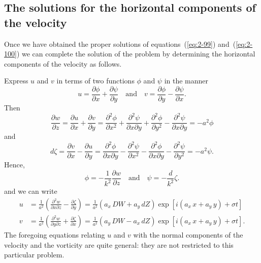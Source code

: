 \subsection{The solutions for the horizontal components of the velocity}\label{sec:10a}

Once we have obtained the proper solutions of equations~(\ref{eq:2-99}) and~(\ref{eq:2-100}) we can complete the solution of the problem by determining the
horizontal components of the velocity as follows.

Express $u$ and $v$ in terms of two functions $\phi$ and $\psi$ in the manner
\begin{equation}
\label{eq:2-106}
u = \frac{\partial\phi}{\partial x}+\frac{\partial\psi}{\partial y} \quad\text{and}\quad v = \frac{\partial\phi}{\partial y}-\frac{\partial\psi}{\partial x}.
\end{equation}
Then
\begin{equation}
\label{eq:2-107}
\frac{\partial w}{\partial z} = \frac{\partial u}{\partial x}+\frac{\partial v}{\partial y} = \frac{\partial^2\phi}{\partial x^2}+\frac{\partial^2\psi}{\partial x\partial y}+\frac{\partial^2\phi}{\partial y^2}-\frac{\partial^2\psi}{\partial x\partial y} = -a^2\phi
\end{equation}
and
\begin{equation}
\label{eq:2-108}
d\zeta = \frac{\partial v}{\partial x}-\frac{\partial u}{\partial y} = \frac{\partial^2\phi}{\partial x\partial y}-\frac{\partial^2\psi}{\partial x^2}-\frac{\partial^2\phi}{\partial x\partial y}-\frac{\partial^2\psi}{\partial y^2} = -a^2\psi.
\end{equation}
Hence,
\begin{equation}
\label{eq:2-109}
\phi = -\frac{1}{k^2}\frac{\partial w}{\partial z} \quad\text{and}\quad \psi = -\frac{d}{k^2}\zeta.
\end{equation}
and we can write
\begin{align}
\label{eq:2-110}
u &= \frac{1}{a^2}\!\left(\frac{\partial^2 w}{\partial x\partial z}-\frac{\partial \zeta}{\partial y}\right) = \frac{1}{a^2}(a_x\,DW + a_y\,dZ)\exp[i(a_x\,x+a_y\,y)+\sigma t] \\
\label{eq:2-111}
v &= \frac{1}{a^2}\!\left(\frac{\partial^2 w}{\partial y\partial z}+\frac{\partial \zeta}{\partial x}\right) = \frac{1}{a^2}(a_y\,DW - a_x\,dZ)\exp[i(a_x\,x+a_y\,y)+\sigma t].
\end{align}
The foregoing equations relating $u$ and $v$ with the normal components
of the velocity and the vorticity are quite general: they are not restricted
to this particular problem.

